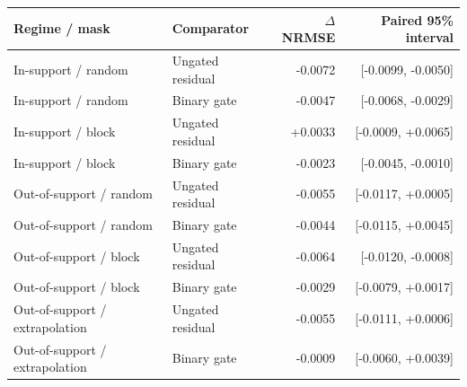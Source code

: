 \scriptsize
\setlength{\tabcolsep}{3pt}
\begin{tabular*}{\linewidth}{@{\extracolsep{\fill}}llrr@{}}\toprule
Regime / mask & Comparator & $\Delta$NRMSE & Paired 95\% interval \\
\midrule
In-support / random & Ungated residual & -0.0072 & [-0.0099, -0.0050] \\
In-support / random & Binary gate & -0.0047 & [-0.0068, -0.0029] \\
In-support / block & Ungated residual & +0.0033 & [-0.0009, +0.0065] \\
In-support / block & Binary gate & -0.0023 & [-0.0045, -0.0010] \\
Out-of-support / random & Ungated residual & -0.0055 & [-0.0117, +0.0005] \\
Out-of-support / random & Binary gate & -0.0044 & [-0.0115, +0.0045] \\
Out-of-support / block & Ungated residual & -0.0064 & [-0.0120, -0.0008] \\
Out-of-support / block & Binary gate & -0.0029 & [-0.0079, +0.0017] \\
Out-of-support / extrapolation & Ungated residual & -0.0055 & [-0.0111, +0.0006] \\
Out-of-support / extrapolation & Binary gate & -0.0009 & [-0.0060, +0.0039] \\
\bottomrule\end{tabular*}
